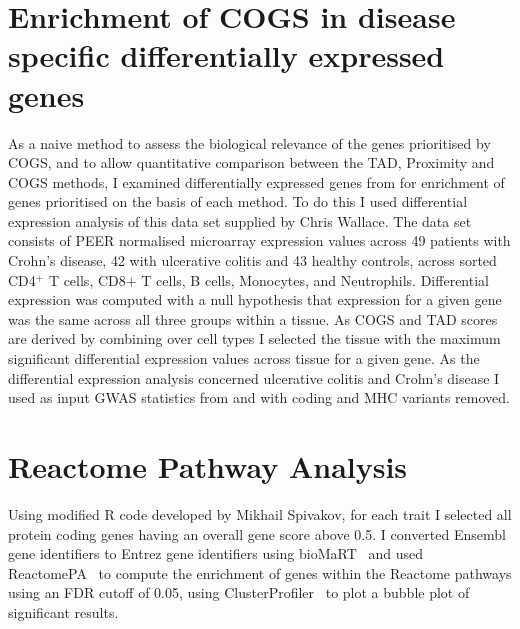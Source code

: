 \documentclass[a4paper,11pt]{report}
\begin{document}
\section{Enrichment of COGS in disease specific differentially expressed genes}
As a naive method to assess the biological relevance of the genes prioritised by COGS, and to allow quantitative comparison between the TAD, Proximity and COGS methods, I examined  differentially expressed genes from \citet{PetersLyonsLeeEtAl2016} for enrichment of genes prioritised on the basis of each method. To do this I used differential expression analysis of this data set supplied by Chris Wallace. The data set consists of PEER normalised microarray expression values across 49 patients with Crohn's disease, 42 with ulcerative colitis and 43 healthy controls, across sorted  CD4$^+$ T cells, CD8$+$ T cells, B cells, Monocytes, and Neutrophils. Differential expression was computed with a null hypothesis that expression for a given gene was the same across all three groups within a tissue. As COGS and TAD scores are derived by combining over cell types I selected the tissue with the maximum significant differential expression values across tissue for a given gene. As the differential expression analysis concerned ulcerative colitis and Crohn's disease I used as input GWAS statistics from \citet{Anderson2011-ch} and \citet{Franke2010-mj} with coding and MHC variants removed.

\section{Reactome Pathway Analysis}
Using modified R code developed by Mikhail Spivakov, for each trait I selected all protein coding genes having an overall gene score above 0.5. I converted Ensembl gene identifiers to Entrez gene identifiers using bioMaRT~\citep{DurinckSpellmanBirneyEtAl2009} and used ReactomePA~\citep{YuHe2016} to compute the enrichment of genes within the Reactome pathways using an FDR cutoff of 0.05, using ClusterProfiler~\citep{YuWangHanEtAl2012} to plot a bubble plot of significant results.  
\end{document}
